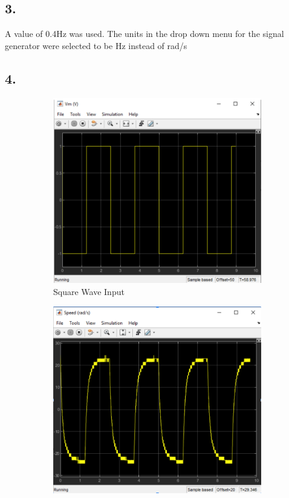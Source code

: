 \documentclass[letterpaper,12pt]{article}
\begin{document}
\subsection*{3.}
A value of 0.4Hz was used. The units in the drop down menu for 
the signal generator were selected to be Hz instead of rad/s

\subsection*{4.}
\begin{figure}[h]
    \centering
    \begin{subfigure}[t]{0.4\textwidth}
        \includegraphics[width=\textwidth]{Figures/square_wave_input.png}
        \caption{Square Wave Input}
        \label{fig:my_label}
    \end{subfigure}
    \begin{subfigure}[t]{0.4\textwidth}
        \includegraphics[width=\textwidth]{Figures/square_wave_velocity_no_filter.png}

\end{subfigure}
\end{figure}
\end{document}
